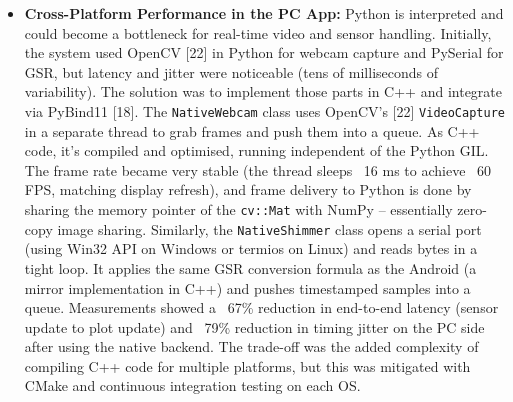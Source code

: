 \begin{itemize}
  \item \textbf{Cross-Platform Performance in the PC App:} Python is interpreted and could become a bottleneck for real-time video and sensor handling. Initially, the system used OpenCV [22] in Python for webcam capture and PySerial for GSR, but latency and jitter were noticeable (tens of milliseconds of variability). The solution was to implement those parts in C++ and integrate via PyBind11 [18]. The \texttt{NativeWebcam} class uses OpenCV's [22] \texttt{VideoCapture} in a separate thread to grab frames and push them into a queue. As C++ code, it's compiled and optimised, running independent of the Python GIL. The frame rate became very stable (the thread sleeps ~16 ms to achieve ~60 FPS, matching display refresh), and frame delivery to Python is done by sharing the memory pointer of the \texttt{cv::Mat} with NumPy -- essentially zero-copy image sharing. Similarly, the \texttt{NativeShimmer} class opens a serial port (using Win32 API on Windows or termios on Linux) and reads bytes in a tight loop. It applies the same GSR conversion formula as the Android (a mirror implementation in C++) and pushes timestamped samples into a queue. Measurements showed a ~67\% reduction in end-to-end latency (sensor update to plot update) and ~79\% reduction in timing jitter on the PC side after using the native backend. The trade-off was the added complexity of compiling C++ code for multiple platforms, but this was mitigated with CMake and continuous integration testing on each OS.

\end{itemize}
